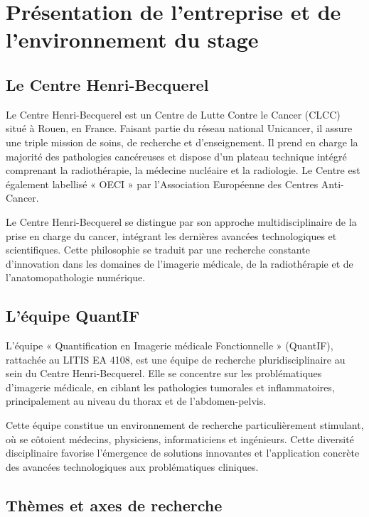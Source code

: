\documentclass[12pt,a4paper]{report}
\let\oldchapter\chapter
\renewcommand{\chapter}{\clearpage\oldchapter}
\begin{document}
\chapter{Présentation de l'entreprise et de l'environnement du stage}

\section{Le Centre Henri-Becquerel}

Le Centre Henri-Becquerel est un Centre de Lutte Contre le Cancer (CLCC) situé à Rouen, en France. Faisant partie du réseau national Unicancer, il assure une triple mission de soins, de recherche et d'enseignement. Il prend en charge la majorité des pathologies cancéreuses et dispose d'un plateau technique intégré comprenant la radiothérapie, la médecine nucléaire et la radiologie. Le Centre est également labellisé « OECI » par l'Association Européenne des Centres Anti-Cancer.

Le Centre Henri-Becquerel se distingue par son approche multidisciplinaire de la prise en charge du cancer, intégrant les dernières avancées technologiques et scientifiques. Cette philosophie se traduit par une recherche constante d'innovation dans les domaines de l'imagerie médicale, de la radiothérapie et de l'anatomopathologie numérique.

\section{L'équipe QuantIF}

L'équipe « Quantification en Imagerie médicale Fonctionnelle » (QuantIF), rattachée au LITIS EA 4108, est une équipe de recherche pluridisciplinaire au sein du Centre Henri-Becquerel. Elle se concentre sur les problématiques d'imagerie médicale, en ciblant les pathologies tumorales et inflammatoires, principalement au niveau du thorax et de l'abdomen-pelvis.

Cette équipe constitue un environnement de recherche particulièrement stimulant, où se côtoient médecins, physiciens, informaticiens et ingénieurs. Cette diversité disciplinaire favorise l'émergence de solutions innovantes et l'application concrète des avancées technologiques aux problématiques cliniques.

\section{Thèmes et axes de recherche}
\end{document}
